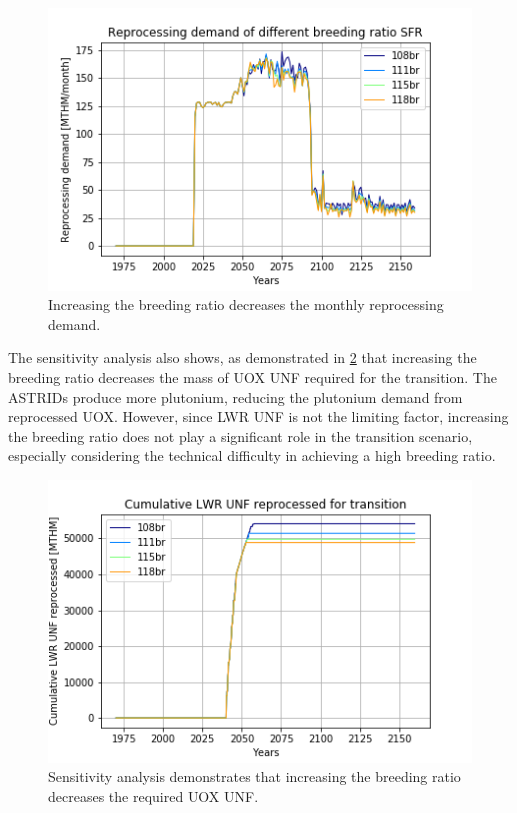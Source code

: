 \begin{figure}[htbp!]
    \begin{center}
        \includegraphics[scale=0.6]{./images/sensitivity/br_tot_rep.png}
    \end{center}
    \caption{Increasing the breeding ratio decreases the monthly reprocessing 
    demand.}
    \label{fig:br_rep}
\end{figure}

The sensitivity analysis also shows, as demonstrated in \cref{fig:br_uox} that 
increasing the breeding ratio decreases the mass of \gls{UOX} \gls{UNF} 
required for the transition. The \glspl{ASTRID} produce more plutonium, reducing the plutonium demand from reprocessed \gls{UOX}. However, since \gls{LWR} \gls{UNF} is not
the limiting factor, increasing the breeding ratio does not play a significant
role in the transition scenario, especially considering the technical difficulty
in achieving a high breeding ratio.

\begin{figure}[htbp!]
    \begin{center}
        \includegraphics[scale=0.6]{./images/sensitivity/br_uox_unf_cum.png}
    \end{center}
    \caption{Sensitivity analysis demonstrates that increasing the breeding 
    ratio decreases the required \gls{UOX} \gls{UNF}. }
    \label{fig:br_uox}
\end{figure}

